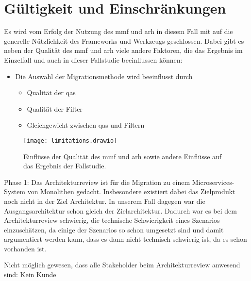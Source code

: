 \chapter{Gültigkeit und Einschränkungen}
\label{chap:gueltigkeit}

Es wird vom Erfolg der Nutzung des \gls{mmf} und \gls{arh} in diesem Fall mit \jf auf die generelle Nützlichkeit des Frameworks und Werkzeugs geschlossen.
Dabei gibt es neben der Qualität des \gls{mmf} und \gls{arh} viele andere Faktoren, die das Ergebnis im Einzelfall und auch in dieser Fallstudie beeinflussen können:

\begin{itemize}
	\item Die Auswahl der Migrationsmethode wird beeinflusst durch
	\begin{itemize}
		\item Qualität der \glspl{qa}
		\item Qualität der Filter
		\item Gleichgewicht zwischen \glspl{qa} und Filtern
	\end{itemize}
\end{itemize}

\begin{figure}
	\centering
	\texttt{[image: limitations.drawio]}
	\caption[Einflüsse auf das Ergebnis der Fallstudie]{
		Einflüsse der Qualität des \gls{mmf} und \gls{arh} sowie andere Einflüsse auf das Ergebnis der Fallstudie.
	}
	\label{fig:limitations}
\end{figure}

Phase 1:
Das Architekturreview ist für die Migration zu einem Microservices-System von Monolithen gedacht.
Insbesondere existiert dabei das Zielprodukt noch nicht in der Ziel Architektur. 
In unserem Fall dagegen war die Ausgangsarchitektur schon gleich der Zielarchitektur.
Dadurch war es bei dem Architekturreview schwierig, die technische Schwierigkeit eines Szenarios einzuschätzen, da einige der Szenarios so schon umgesetzt sind und damit argumentiert werden kann, dass es dann nicht technisch schwierig ist, da es schon vorhanden ist.

Nicht möglich gewesen, dass alle Stakeholder beim Architekturreview anwesend sind: Kein Kunde  

